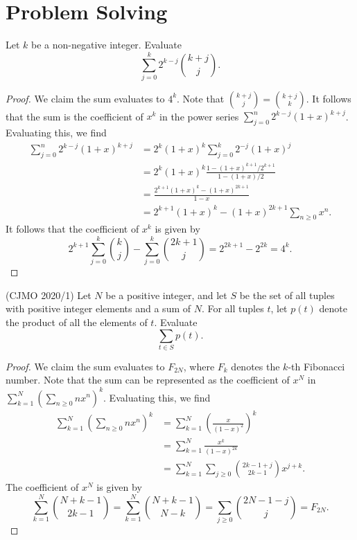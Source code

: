 \documentclass[11pt]{article}
\renewcommand{\>}{\rangle}
\newcommand{\<}{\langle}
\begin{document}
\section{Problem Solving}
\begin{problem}[Putnam 2020 A2] Let $k$ be a non-negative integer.  Evaluate 
$$\sum_{j=0}^k 2^{k-j} \binom{k+j}{j}.$$
\begin{proof}
We claim the sum evaluates to $4^k$.  Note that $\binom{k+j}{j} = \binom{k+j}{k}$.  It follows that the sum is the coefficient of $x^k$ in the power series $\sum_{j=0}^n 2^{k-j} (1 + x)^{k + j}$.  Evaluating this, we find
\begin{align*}
\sum_{j=0}^n 2^{k-j} (1 + x)^{k + j} &= 2^{k}(1 + x)^{k} \sum_{j=0}^k 2^{-j} (1 + x)^j \\
&= 2^k (1 + x)^k \frac{1 - (1 + x)^{k+1}/2^{k+ 1}}{1 - (1 + x)/2} \\
&= \frac{2^{k + 1}(1 + x)^k - (1 + x)^{2k + 1}}{1 - x} \\
&= 2^{k + 1}(1 + x)^k - (1 + x)^{2k + 1} \sum_{n \ge 0} x^n.
\end{align*}
It follows that the coefficient of $x^k$ is given by 
$$2^{k +1} \sum_{j=0}^k \binom{k}{j} - \sum_{j=0}^k \binom{2k+1}{j} = 2^{2k+1} - 2^{2k} = 4^k.$$
\end{proof}
\end{problem} 
\begin{problem}(CJMO 2020/1) Let $N$ be a positive integer, and let $S$ be the set of all tuples with positive integer elements and a sum of $N$.  For all tuples $t$, let $p(t)$ denote the product of all the elements of $t$.  Evaluate 
$$\sum_{t \in S} p(t).$$
\end{problem}
\begin{proof}
We claim the sum evaluates to $F_{2N}$, where $F_k$ denotes the $k$-th Fibonacci number.  Note that the sum can be represented as the coefficient of $x^N$ in $\sum_{k=1}^N \left (\sum_{n \ge 0} nx^n \right)^k$.  Evaluating this, we find 
\begin{align*}
\sum_{k=1}^N \left (\sum_{n \ge 0} nx^n \right)^k &=  \sum_{k=1}^N \left ( \frac{x}{(1 - x)^2} \right)^k \\
&= \sum_{k=1}^N \frac{x^k}{(1 - x)^{2k}} \\
&= \sum_{k=1}^N \sum_{j \ge 0} \binom{2k - 1 + j}{2k - 1} x^{j + k} .
\end{align*}
The coefficient of $x^N$ is given by  $$\sum_{k=1}^N \binom{N + k - 1}{2k - 1} = \sum_{k=1}^N \binom{N + k - 1}{N - k} = \sum_{j \ge 0} \binom{2N - 1 - j}{j} = F_{2N}.$$
\end{proof}
\end{document}
